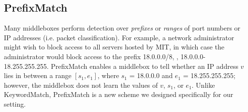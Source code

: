 %
%
%
%
%
%
%
%
%
%
%
%

\subsection{PrefixMatch} \label{sec:range}



Many middleboxes perform detection over {\it prefixes} or {\it ranges} of port numbers or IP addresses (i.e. packet classification). For example, a network administrator might wish to block access to all servers hosted by MIT, in which case the administrator would block access to the prefix 18.0.0.0/8, \ie{}, 18.0.0.0-18.255.255.255. PrefixMatch enables a middlebox to tell whether an IP address $v$ lies in between a range $[s_1, e_1]$, where $s_1$ = 18.0.0.0 and $e_1$ = 18.255.255.255; however, the middlebox does not learn the values of $v$, $s_1$, or $e_1$. Unlike KeywordMatch, PrefixMatch is a new scheme we designed specifically for our setting.

